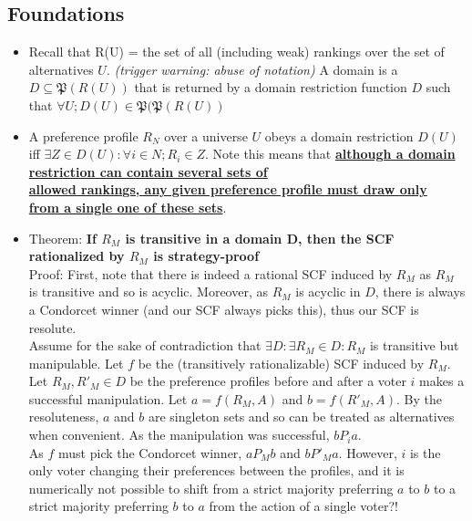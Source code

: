 \documentclass[20pt,a4paper,landscape]{extarticle}
\begin{document}
\begin{flushleft}
\subsection{Foundations}
\begin{itemize}
\item Recall that R(U) = the set of all (including weak) rankings over the set of alternatives $U$. \textit{(trigger warning: abuse of notation)} A domain is a $D \subseteq \mathfrak{P}(R(U))$ that is returned by a domain restriction function $D$ such that $\forall U; D(U) \in \mathfrak{P}(\mathfrak{P}(R(U))$
\item A preference profile $R_N$ over a universe $U$ obeys a domain restriction $D(U)$ iff $\exists Z \in D(U): \forall i \in N; R_i \in Z$. Note this means that \textbf{\underline{although a domain restriction can contain several sets of}\\
\underline{allowed rankings, any given preference profile must draw only}\\
\underline{from a single one of these sets}}.
\item Theorem: \textbf{If $R_M$ is transitive in a domain D, then the SCF rationalized by $R_M$ is strategy-proof}\\
Proof: First, note that there is indeed a rational SCF induced by $R_M$ as $R_M$ is transitive and so is acyclic. Moreover, as $R_M$ is acyclic in $D$, there is always a Condorcet winner (and our SCF always picks this), thus our SCF is resolute.\\
Assume for the sake of contradiction that $\exists D: \exists R_M \in D: R_M$ is transitive but manipulable. Let $f$ be the (transitively rationalizable) SCF induced by $R_M$. Let $R_M, R'_M \in D$ be the preference profiles before and after a voter $i$ makes a successful manipulation. Let $a = f(R_M, A)$ and $b = f(R'_M, A)$. By the resoluteness, $a$ and $b$ are singleton sets and so can be treated as alternatives when convenient. As the manipulation was successful, $bP_ia$.\\
As $f$ must pick the Condorcet winner, $aP_Mb$ and $bP'_Ma$. However, $i$ is the only voter changing their preferences between the profiles, and it is numerically not possible to shift from a strict majority preferring $a$ to $b$ to a strict majority preferring $b$ to $a$ from the action of a single voter?!
\end{itemize}

\end{flushleft}
\end{document}
